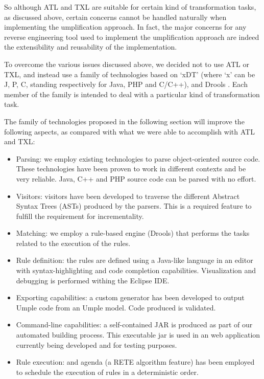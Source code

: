 So although ATL and TXL are suitable for certain kind of transformation tasks, as discussed above,  certain concerns cannot be handled naturally when implementing the umplification approach. In fact, the major concerns for any reverse engineering tool used to implement the umplification approach are indeed the extensibility and reusability of the implementation.

To overcome the various issues discussed above, we decided not to use ATL or TXL, and instead use a family of technologies based on `xDT'  (where `x' can be J, P, C, standing respectively for Java, PHP and C/C++), and Drools \cite{Drools_Book}. Each member of the family is intended to deal with a particular kind of transformation task. 

The family of technologies proposed in the following section will improve the following aspects, as compared with what we were able to accomplish with ATL and TXL:

\begin{itemize}
\item Parsing: we employ existing technologies to parse object-oriented source code. These technologies have been proven to work in different contexts and be very reliable. Java, C++ and PHP source code can be parsed with no effort.

\item Visitors: visitors have been developed to traverse the different Abstract Syntax Trees (ASTs) produced by the parsers. This is a required feature to fulfill the requirement for incrementality.

\item Matching: we employ a rule-based engine (Drools) that performs the tasks related to the execution of the rules.

\item Rule definition: the rules are defined using a Java-like language in an editor with syntax-highlighting and code completion capabilities. Visualization and debugging is performed withing the Eclipse IDE. 

\item Exporting capabilities: a custom generator has been developed to output Umple code from an Umple model. Code produced is validated.

\item Command-line capabilities: a self-contained JAR is produced as part of our automated building process. This executable jar is used in an web application currently being developed and for testing purposes.

\item Rule execution: and agenda (a RETE algorithm feature) has been employed to schedule the execution of rules in a deterministic order. 
\end{itemize}


